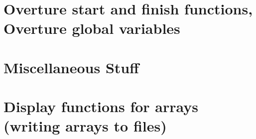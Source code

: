 \documentclass{article}
\begin{document}
\vfill\eject
\tableofcontents


\vfill\eject
\section{Overture start and finish functions, Overture global variables}




\vfill\eject
\section{Miscellaneous Stuff}


\vfill\eject


\vfill\eject


\vfill\eject


\vfill\eject
\section{Display functions for arrays (writing arrays to files)}


\vfill\eject

\end{document}
